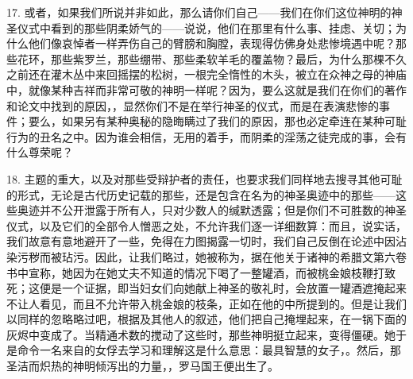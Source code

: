 17. 或者，如果我们所说并非如此，那么请你们自己——我们在你们这位神明的神圣仪式中看到的那些阴柔娇气的——说说，他们在那里有什么事、挂虑、关切；为什么他们像哀悼者一样弄伤自己的臂膀和胸膛，表现得仿佛身处悲惨境遇中呢？那些花环，那些紫罗兰，那些绷带、那些柔软羊毛的覆盖物？最后，为什么那棵不久之前还在灌木丛中来回摇摆的松树，一根完全惰性的木头，被立在众神之母的神庙中，就像某种吉祥而非常可敬的神明一样呢？因为，要么这就是我们在你们的著作和论文中找到的原因，，显然你们不是在举行神圣的仪式，而是在表演悲惨的事件；要么，如果另有某种奥秘的隐晦瞒过了我们的原因，那也必定牵连在某种可耻行为的丑名之中。因为谁会相信，无用的着手，而阴柔的淫荡之徒完成的事，会有什么尊荣呢？\par

18. 主题的重大，以及对那些受辩护者的责任，也要求我们同样地去搜寻其他可耻的形式，无论是古代历史记载的那些，还是包含在名为的神圣奥迹中的那些——这些奥迹并不公开泄露于所有人，只对少数人的缄默透露；但是你们不可胜数的神圣仪式，以及它们的全部令人憎恶之处，不允许我们逐一详细数算：而且，说实话，我们故意有意地避开了一些，免得在力图揭露一切时，我们自己反倒在论述中因沾染污秽而被玷污。因此，让我们略过，她被称为，据在他关于诸神的希腊文第六卷书中宣称，她因为在她丈夫不知道的情况下喝了一整罐酒，而被桃金娘枝鞭打致死；这便是一个证据，即当妇女们向她献上神圣的敬礼时，会放置一罐酒遮掩起来不让人看见，而且不允许带入桃金娘的枝条，正如在他的中所提到的。但是让我们以同样的忽略略过吧，根据及其他人的叙述，他们把自己掩埋起来，在一锅下面的灰烬中变成了。当精通术数的搅动了这些时，那些神明挺立起来，变得僵硬。她于是命令一名来自的女俘去学习和理解这是什么意思：最具智慧的女子，。然后，那圣洁而炽热的神明倾泻出的力量，，罗马国王便出生了。\par


